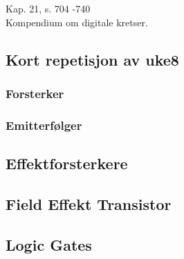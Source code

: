 Kap. 21, s. 704 -740 \\
Kompendium om digitale kretser.

\subsection{Kort repetisjon av uke8}
  \subsubsection{Forsterker}
    
  \subsubsection{Emitterfølger}
    

\subsection{Effektforsterkere}
  

\subsection{Field Effekt Transistor}
  

\subsection{Logic Gates}
  
